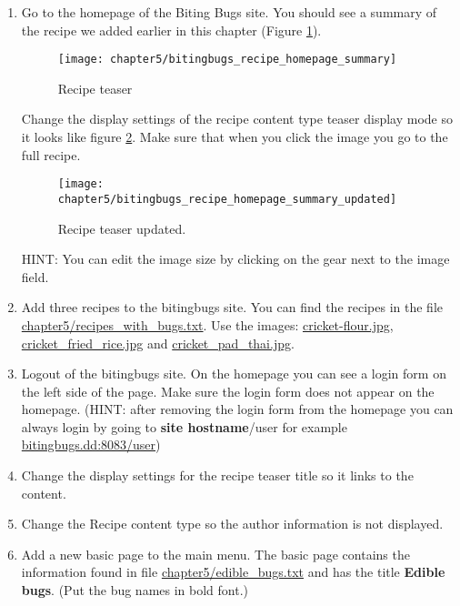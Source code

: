   \begin{enumerate}
  	\item Go to the homepage of the Biting Bugs site. You should see a summary of the recipe we added earlier in this chapter (Figure \ref{fig:bitingbugs_recipe_homepage_summary}).  
  	
   \begin{figure}[H]
   	\centering
   	\texttt{[image: chapter5/bitingbugs\_recipe\_homepage\_summary]}
   	\caption{Recipe teaser}
   	\label{fig:bitingbugs_recipe_homepage_summary}
   \end{figure}
   
   Change the display settings of the recipe content type teaser display mode so it looks like figure \ref{fig:bitingbugs_recipe_homepage_summary_updated}. Make sure that when you click the image you go to the full recipe.
   
   \begin{figure}[H]
   	\centering
   	\texttt{[image: chapter5/bitingbugs\_recipe\_homepage\_summary\_updated]}
   	\caption{Recipe teaser updated.}
   	\label{fig:bitingbugs_recipe_homepage_summary_updated}
   \end{figure}
   
   HINT: You can edit the image size by clicking on the gear next to the image field.
   
   \item Add three recipes to the bitingbugs site. You can find the recipes in the file \url{chapter5/recipes_with_bugs.txt}. Use the images: \url{cricket-flour.jpg}, \url{cricket_fried_rice.jpg} and \url{cricket_pad_thai.jpg}.
   
   \item Logout of the bitingbugs site. On the homepage you can see a login form on the left side of the page. Make sure the login form does not appear on the homepage. (HINT: after removing the login form from the homepage you can always login by going to \textbf{site hostname}/user for example  \url{bitingbugs.dd:8083/user})
   
   \item Change the display settings for the recipe teaser title so it links to the content.
   
   \item Change the Recipe content type so the author information is not displayed.
   
   \item Add a new basic page to the main menu. The basic page contains the information found in file \url{chapter5/edible_bugs.txt} and has the title \textbf{Edible bugs}. (Put the bug names in bold font.)
   
  \end{enumerate}